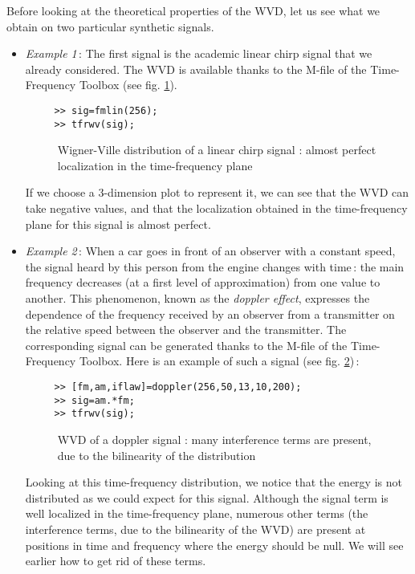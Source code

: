   Before looking at the theoretical properties of the WVD, let us see what
we obtain on two particular synthetic signals.
\begin{itemize}
\item {\it Example 1}\,: The first signal is the academic linear chirp
signal that we already considered. The WVD is available thanks to the
M-file  of the Time-Frequency
Toolbox (see fig. \ref{En1fig1}).
\begin{verbatim}
     >> sig=fmlin(256);
     >> tfrwv(sig);
\end{verbatim}
\begin{figure}[htb]
\epsfxsize=10cm
\epsfysize=8cm
\centerline{}
\caption{\label{En1fig1}Wigner-Ville distribution of a linear chirp signal
: almost perfect localization in the time-frequency plane}
\end{figure}
If we choose a 3-dimension plot to represent it, we can see that the WVD
can take negative values, and that the localization obtained in the
time-frequency plane for this signal is almost perfect.

\item {\it Example 2}\,: When a car goes in front of an observer with a
constant speed, the signal heard by this person from the engine changes
with time\,: the main frequency decreases (at a first level of
approximation) from one value to another. This phenomenon, known as the
{\it doppler effect}, expresses the dependence of the
frequency received by an observer from a transmitter on the relative speed
between the observer and the transmitter. The corresponding signal can be
generated thanks to the M-file  of the Time-Frequency Toolbox. Here is an example of such a
signal (see fig. \ref{En1fig2})\,:
\begin{verbatim}
     >> [fm,am,iflaw]=doppler(256,50,13,10,200);
     >> sig=am.*fm;
     >> tfrwv(sig);
\end{verbatim}
\begin{figure}[htb]
\epsfxsize=10cm
\epsfysize=8cm
\centerline{}
\caption{\label{En1fig2}WVD of a doppler signal : many interference terms
are present, due to the bilinearity of the distribution}
\end{figure}
Looking at this time-frequency distribution, we notice that the energy is
not distributed as we could expect for this signal. Although the signal
term is well localized in the time-frequency plane, numerous other terms
(the interference terms, due to the bilinearity of the WVD) are present at
positions in time and frequency where the energy should be null. We will
see earlier how to get rid of these terms.
\end{itemize}

